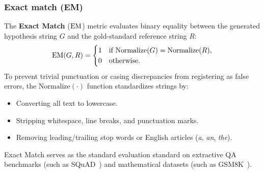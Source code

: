 \documentclass[../../../main.tex]{subfiles}
\begin{document}
\subsubsection{Exact match (EM)}
The \textbf{Exact Match} ($\mathrm{EM}$) metric evaluates binary equality between the generated hypothesis string $G$ and the gold-standard reference string $R$:
\begin{equation}
\label{eq:exact_match_def}
\mathrm{EM}(G, R) = \begin{cases} 
1 & \text{if } \text{Normalize}(G) = \text{Normalize}(R), \\
0 & \text{otherwise}.
\end{cases}
\end{equation}
To prevent trivial punctuation or casing discrepancies from registering as false errors, the $\text{Normalize}(\cdot)$ function standardizes strings by:
\begin{itemize}
    \item Converting all text to lowercase.
    \item Stripping whitespace, line breaks, and punctuation marks.
    \item Removing leading/trailing stop words or English articles (\textit{a}, \textit{an}, \textit{the}).
\end{itemize}
Exact Match serves as the standard evaluation standard on extractive QA benchmarks (such as SQuAD~\cite{rajpurkar2016squad}) and mathematical datasets (such as GSM8K~\cite{cobbe2021gsm8k}).
\end{document}

